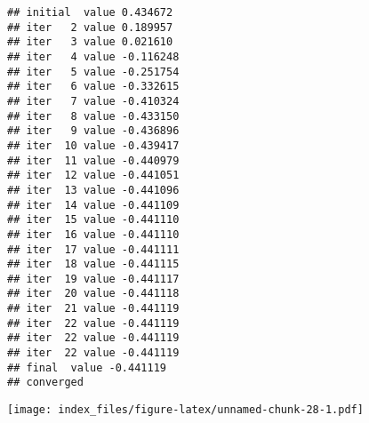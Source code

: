 \documentclass[
]{book}
\newenvironment{Shaded}{\begin{snugshade}}{\end{snugshade}}
\newcommand{\AttributeTok}[1]{\textcolor[rgb]{0.77,0.63,0.00}{#1}}
\newcommand{\DecValTok}[1]{\textcolor[rgb]{0.00,0.00,0.81}{#1}}
\newcommand{\FunctionTok}[1]{\textcolor[rgb]{0.00,0.00,0.00}{#1}}
\newcommand{\NormalTok}[1]{#1}
\newcommand{\OtherTok}[1]{\textcolor[rgb]{0.56,0.35,0.01}{#1}}
\newcommand{\SpecialCharTok}[1]{\textcolor[rgb]{0.00,0.00,0.00}{#1}}
\newcommand{\StringTok}[1]{\textcolor[rgb]{0.31,0.60,0.02}{#1}}
\begin{document}
\begin{Shaded}
\end{Shaded}

\begin{verbatim}
## initial  value 0.434672 
## iter   2 value 0.189957
## iter   3 value 0.021610
## iter   4 value -0.116248
## iter   5 value -0.251754
## iter   6 value -0.332615
## iter   7 value -0.410324
## iter   8 value -0.433150
## iter   9 value -0.436896
## iter  10 value -0.439417
## iter  11 value -0.440979
## iter  12 value -0.441051
## iter  13 value -0.441096
## iter  14 value -0.441109
## iter  15 value -0.441110
## iter  16 value -0.441110
## iter  17 value -0.441111
## iter  18 value -0.441115
## iter  19 value -0.441117
## iter  20 value -0.441118
## iter  21 value -0.441119
## iter  22 value -0.441119
## iter  22 value -0.441119
## iter  22 value -0.441119
## final  value -0.441119 
## converged
\end{verbatim}

\texttt{[image: index\_files/figure-latex/unnamed-chunk-28-1.pdf]}

\begin{Shaded}
\end{Shaded}
\end{document}
